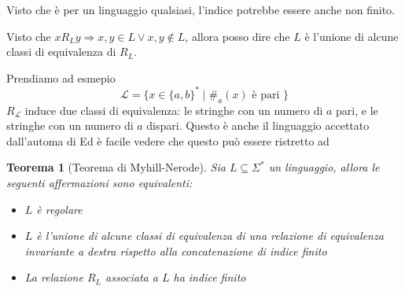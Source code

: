 \documentclass[12pt]{article}
\newtheorem{teorema}{Teorema}
\begin{document}
Visto che è per un linguaggio qualsiasi, l'indice potrebbe essere anche non finito.

Visto che $x R_L y \Rightarrow x, y \in L \vee x, y \not \in L$, allora posso dire che $L$ è l'unione di alcune classi di equivalenza di $R_L$.

\begin{tcolorbox}
	Prendiamo ad esmepio
	$$ \mathcal{L} = \{ x \in \{a, b\}^* \mid \#_a(x) \text{ è pari } \} $$
	$R_{\mathcal{L}}$ induce due classi di equivalenza: le stringhe con un numero di $a$ pari, e le stringhe con un numero di $a$ dispari.
	Questo è anche il linguaggio accettato dall'automa di %
	Ed è facile vedere che questo può essere ristretto ad
\end{tcolorbox}

\begin{teorema}[Teorema di Myhill-Nerode] %
	Sia $L \subseteq \Sigma^*$ un linguaggio, allora le seguenti affermazioni sono equivalenti:
	\begin{itemize}
		\item[(a)] $L$ è regolare
		\item[(b)] $L$ è l'unione di alcune classi di equivalenza di una relazione di equivalenza invariante a destra rispetto alla concatenazione di indice finito
		\item[(c)] La relazione $R_L$ associata a $L$ ha indice finito
	\end{itemize}
\end{teorema}
\end{document}
